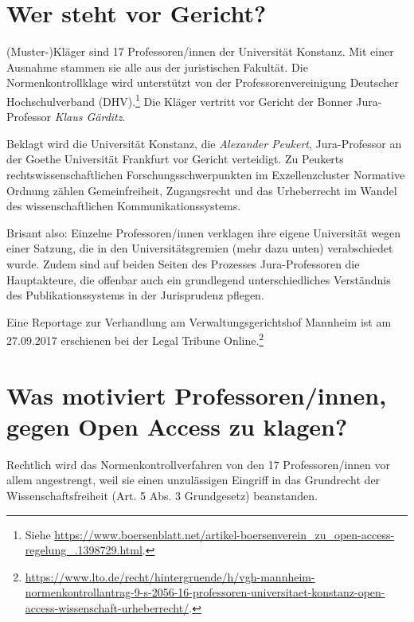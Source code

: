 \documentclass[a4paper,
fontsize=11pt,
oneside,
numbers=noperiodatend,
parskip=half-,
bibliography=totoc,
final
]{scrartcl}
\begin{document}
\hypertarget{wer-steht-vor-gericht}{%
\section*{Wer steht vor Gericht?}\label{wer-steht-vor-gericht}}

(Muster-)Kläger sind 17 Professoren/innen der Universität Konstanz. Mit
einer Ausnahme stammen sie alle aus der juristischen Fakultät. Die
Normenkontrollklage wird unterstützt von der Professorenvereinigung
Deutscher Hochschulverband (DHV).\footnote{Siehe
  \url{https://www.boersenblatt.net/artikel-boersenverein_zu_open-access-regelung_.1398729.html}.}
Die Kläger vertritt vor Gericht der Bonner Jura-Professor \emph{Klaus
Gärditz}.

Beklagt wird die Universität Konstanz, die \emph{Alexander Peukert},
Jura-Professor an der Goethe Universität Frankfurt vor Gericht
verteidigt. Zu Peukerts rechtswissenschaftlichen For\-schungs\-schwer\-punkt\-en
im Exzellenzcluster Normative Ordnung zählen Gemeinfreiheit,
Zugangsrecht und das Urheberrecht im Wandel des wissenschaftlichen
Kommunikationssystems.

Brisant also: Einzelne Professoren/innen verklagen ihre eigene
Universität wegen einer Satzung, die in den Universitätsgremien (mehr
dazu unten) verabschiedet wurde. Zudem sind auf beiden Seiten des
Prozesses Jura-Professoren die Hauptakteure, die offenbar auch ein
grundlegend unterschiedliches Verständnis des Publikationssystems in der
Jurisprudenz pflegen.

Eine Reportage zur Verhandlung am Verwaltungsgerichtshof Mannheim ist am
27.09.2017 erschienen bei der Legal Tribune Online.\footnote{\url{https://www.lto.de/recht/hintergruende/h/vgh-mannheim-normenkontrollantrag-9-s-2056-16-professoren-universitaet-konstanz-open-access-wissenschaft-urheberrecht/}.}

\hypertarget{was-motiviert-professoreninnen-gegen-open-access-zu-klagen}{%
\section*{Was motiviert Professoren/innen, gegen Open Access zu
klagen?}\label{was-motiviert-professoreninnen-gegen-open-access-zu-klagen}}

Rechtlich wird das Normenkontrollverfahren von den 17 Professoren/innen
vor allem angestrengt, weil sie einen unzulässigen Eingriff in das
Grundrecht der Wissenschaftsfreiheit (Art. 5 Abs. 3 Grundgesetz)
beanstanden.
\end{document}
